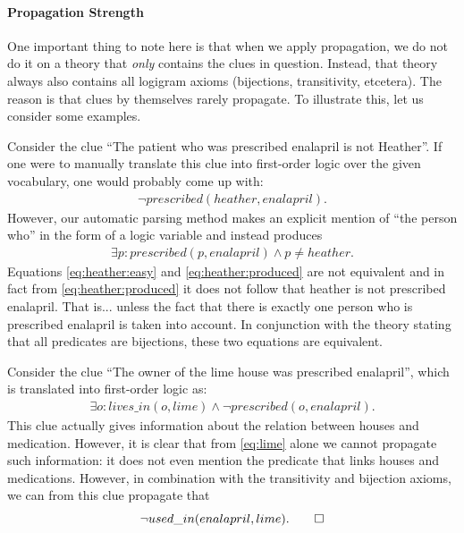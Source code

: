 
\paragraph{Propagation Strength}
One important thing to note here is that when we apply propagation, we do not do it on a theory that \emph{only} contains the clues in question. Instead, that theory always also contains all logigram axioms (bijections, transitivity, etcetera). 
The reason is that clues by themselves rarely propagate. To illustrate this, let us consider some examples. 
\begin{example}
 Consider the clue ``The patient who was prescribed enalapril is not Heather''. If one were to manually translate this clue into first-order logic over the given vocabulary, one would probably come up with: 
 \begin{align}\lnot \mathit{prescribed}(heather,enalapril).\label{eq:heather:easy}\end{align}
 However, our automatic parsing method makes an explicit mention of ``the person who'' in the form of a logic variable and instead produces 
 \begin{align}
  \exists p: prescribed(p,enalapril) \land p \neq heather.\label{eq:heather:produced}
\end{align}
Equations \eqref{eq:heather:easy} and \eqref{eq:heather:produced} are not equivalent and in fact from \eqref{eq:heather:produced} it does not follow that heather is not prescribed enalapril. That is... unless the fact that there is exactly one person who is prescribed enalapril is taken into account. In conjunction with the theory stating that all predicates are bijections, these two equations are equivalent. 
% 
% 
\end{example}

\begin{example}
 Consider the clue ``The owner of the lime house was prescribed enalapril'', which is translated into first-order logic as:
 \begin{align}
\exists o: lives\_in(o,lime) \land \lnot prescribed(o,enalapril).   \label{eq:lime}
 \end{align}
 This clue actually gives information about the relation between houses and medication. However, it is clear that from \eqref{eq:lime} alone we cannot propagate such information: it does not even mention the predicate that links houses and medications. 
 However, in combination with the transitivity and bijection axioms, we can from this clue propagate that 
 \[\lnot used\_in(enalapril,lime).\qedhere\]
\end{example}

